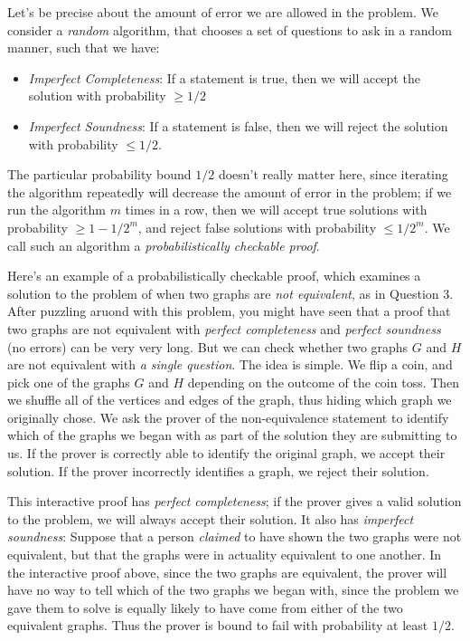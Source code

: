 \documentclass[answers]{exam}
\begin{document}
Let's be precise about the amount of error we are allowed in the problem. We consider a \emph{random} algorithm, that chooses a set of questions to ask in a random manner, such that we have:
%
\begin{itemize}
	\item \emph{Imperfect Completeness}: If a statement is true, then we will accept the solution with probability $\geq 1/2$

	\item \emph{Imperfect Soundness}: If a statement is false, then we will reject the solution with probability $\leq 1/2$.
\end{itemize}
%
The particular probability bound $1/2$ doesn't really matter here, since iterating the algorithm repeatedly will decrease the amount of error in the problem; if we run the algorithm $m$ times in a row, then we will accept true solutions with probability $\geq 1 - 1/2^m$, and reject false solutions with probability $\leq 1/2^m$. We call such an algorithm a \emph{probabilistically checkable proof}.

Here's an example of a probabilistically checkable proof, which examines a solution to the problem of when two graphs are \emph{not equivalent}, as in Question 3. After puzzling aruond with this problem, you might have seen that a proof that two graphs are not equivalent with \emph{perfect completeness} and \emph{perfect soundness} (no errors) can be very very long. But we can check whether two graphs $G$ and $H$ are not equivalent with \emph{a single question}. The idea is simple. We flip a coin, and pick one of the graphs $G$ and $H$ depending on the outcome of the coin toss. Then we shuffle all of the vertices and edges of the graph, thus hiding which graph we originally chose. We ask the prover of the non-equivalence statement to identify which of the graphs we began with as part of the solution they are submitting to us. If the prover is correctly able to identify the original graph, we accept their solution. If the prover incorrectly identifies a graph, we reject their solution.

This interactive proof has \emph{perfect completeness}; if the prover gives a valid solution to the problem, we will always accept their solution. It also has \emph{imperfect soundness}: Suppose that a person \emph{claimed} to have shown the two graphs were not equivalent, but that the graphs were in actuality equivalent to one another. In the interactive proof above, since the two graphs are equivalent, the prover will have no way to tell which of the two graphs we began with, since the problem we gave them to solve is equally likely to have come from either of the two equivalent graphs. Thus the prover is bound to fail with probability at least $1/2$.
\end{document}
